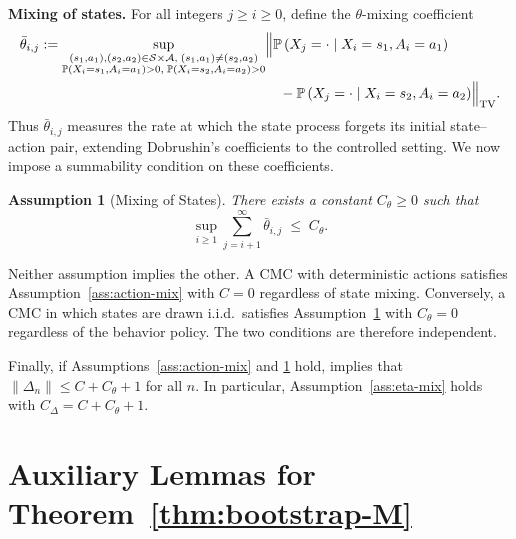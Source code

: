 \documentclass{article}
\numberwithin{equation}{section}
\newcommand{\lp}{\left(}
\newcommand{\rp}{\right)}
\newcommand{\Pbb}{\mathbb{P}}
\newcommand{\prob}{\Pbb}
\newtheorem{assumption}{Assumption}
\begin{document}
\medskip\noindent\textbf{Mixing of states.}
For all integers $j\ge i\ge 0$, define the $\theta$-mixing coefficient
\begin{align*}
\bar\theta_{i,j} :=
\underset{\substack{(s_1,a_1), (s_2,a_2) \in \mathcal S \times \mathcal A, \;(s_1,a_1)\neq(s_2,a_2)\\ \prob(X_i=s_1,A_i=a_1)>0,\;\prob(X_i=s_2,A_i=a_2)>0}}{\sup}
&\Bigl\|\prob\lp X_j=\cdot\mid X_i=s_1,A_i=a_1\rp \\
&\quad -\prob\lp X_j=\cdot\mid X_i=s_2,A_i=a_2\rp\Bigr\|_{\mathrm{TV}}.
\end{align*}
Thus $\bar\theta_{i,j}$ measures the rate at which the state process forgets its initial state--action pair, extending Dobrushin's coefficients \citep{dobrushin1956central} to the controlled setting.
We now impose a summability condition on these coefficients.
\begin{assumption}[Mixing of States]
\label{ass:state-mix}
There exists a constant $C_\theta\ge 0$ such that
\[
\sup_{i\ge 1}\sum_{j=i+1}^{\infty}\bar\theta_{i,j} \;\le\; C_\theta.
\]
\end{assumption}

Neither assumption implies the other. A CMC with deterministic actions satisfies Assumption~\ref{ass:action-mix} with $C=0$ regardless of state mixing. Conversely, a CMC in which states are drawn i.i.d.\ satisfies Assumption~\ref{ass:state-mix} with $C_\theta=0$ regardless of the behavior policy. The two conditions are therefore independent.

Finally, if Assumptions~\ref{ass:action-mix} and \ref{ass:state-mix} hold, \citet[Lemma~3]{banerjee2025off} implies that $\|\Delta_n\|\le C+C_\theta+1$ for all $n$. 
In particular, Assumption~\ref{ass:eta-mix} holds with $C_\Delta = C+C_\theta+1$.

\section{Auxiliary Lemmas for Theorem~\ref{thm:bootstrap-M}}
\label{app:lemmas}
\end{document}
